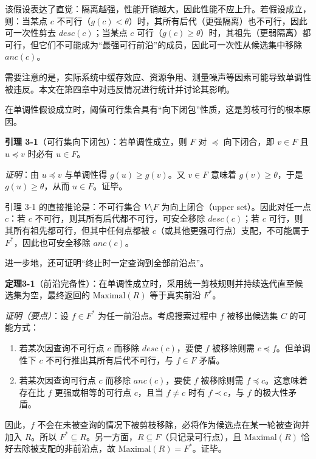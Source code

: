 \documentclass[UTF8,a4paper,12pt,twoside]{ctexart}  %
\begin{document}
该假设表达了直觉：隔离越强，性能开销越大，因此性能不应上升。若假设成立，则：当某点 \(c\)
不可行（\(g(c)<\theta\)）时，其所有后代（更强隔离）也不可行，因此可一次性剪去
\(desc(c)\)；当某点 \(c\)
可行（\(g(c)\ge\theta\)）时，其祖先（更弱隔离）都可行，但它们不可能成为``最强可行前沿''的成员，因此可一次性从候选集中移除
\(anc(c)\)。

需要注意的是，实际系统中缓存效应、资源争用、测量噪声等因素可能导致单调性被违反。本文在第四章中对违反情况进行统计并讨论其影响。

在单调性假设成立时，阈值可行集合具有``向下闭包''性质，这是剪枝可行的根本原因。

\textbf{引理 3-1}（可行集向下闭包）：若单调性成立，则 \(F\) 对
\(\preceq\) 向下闭合，即 \(v\in F\) 且 \(u\preceq v\) 时必有
\(u\in F\)。

\emph{证明}：由 \(u\preceq v\) 与单调性得 \(g(u)\ge g(v)\)。又
\(v\in F\) 意味着 \(g(v)\ge \theta\)，于是 \(g(u)\ge \theta\)，从而
\(u\in F\)。证毕。

引理 3-1 的直接推论是：不可行集合 \(V\setminus F\) 为向上闭合（upper
set）。因此对任一点 \(c\)：若 \(c\) 不可行，则其所有后代都不可行，可安全移除 \(desc(c)\)；若 \(c\)
可行，则其所有祖先都可行，但其中任何点都被
\(c\)（或其他更强可行点）支配，不可能属于 \(F^*\)，因此也可安全移除
\(anc(c)\)。

进一步地，还可证明``终止时一定查询到全部前沿点''。

\textbf{定理3-1}（前沿完备性）：在单调性成立时，采用统一剪枝规则并持续迭代直至候选集为空，最终返回的
\(\text{Maximal}(R)\) 等于真实前沿 \(F^*\)。

\emph{证明（要点）}：设 \(f\in F^*\) 为任一前沿点。考虑搜索过程中 \(f\)
被移出候选集 \(C\) 的可能方式：
\begin{enumerate}
\def\labelenumi{\arabic{enumi}.}
\item
  若某次因查询不可行点 \(c\) 而移除 \(desc(c)\)，要使 \(f\) 被移除则需
  \(c\preceq f\)。但单调性下 \(c\) 不可行推出其所有后代不可行，与
  \(f\in F\) 矛盾。
\item
  若某次因查询可行点 \(c\) 而移除 \(anc(c)\)，要使 \(f\) 被移除则需
  \(f\preceq c\)。这意味着存在比 \(f\) 更强或相等的可行点 \(c\)，且当
  \(f\ne c\) 时有 \(f\prec c\)，与 \(f\) 的极大性矛盾。
\end{enumerate}

因此，\(f\)
不会在未被查询的情况下被剪枝移除，必将作为候选点在某一轮被查询并加入
\(R\)。所以
\(F^*\subseteq R\)。另一方面，\(R\subseteq F\)（只记录可行点），且
\(\text{Maximal}(R)\) 恰好去除被支配的非前沿点，故
\(\text{Maximal}(R)=F^*\)。证毕。
\end{document}
